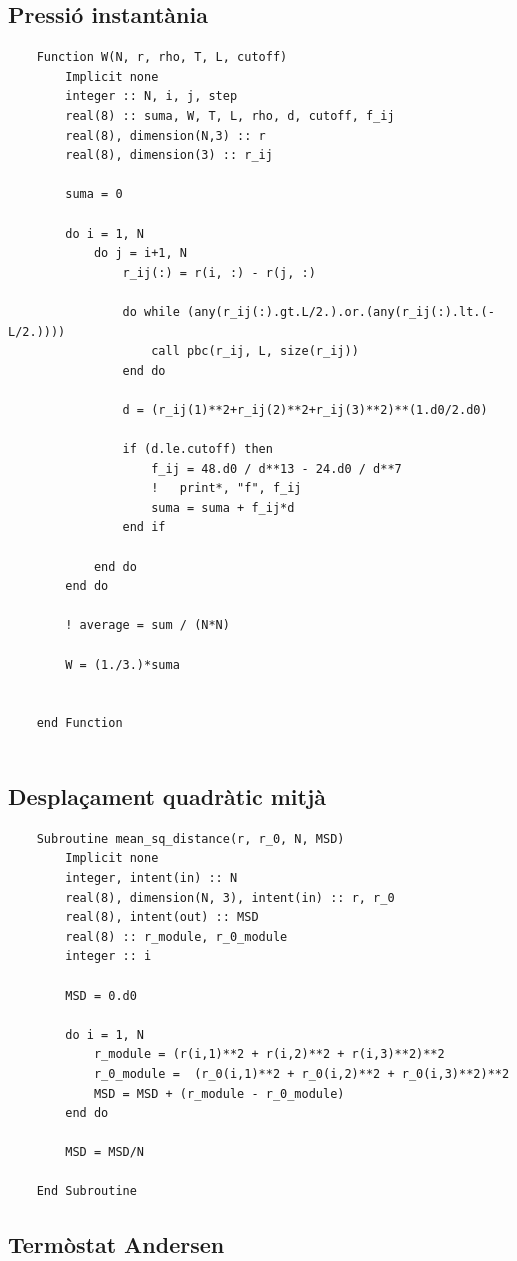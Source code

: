 \documentclass[a4paper,10pt]{article}
\begin{document}
\subsection{Pressió instantània}

\begin{lstlisting}
	Function W(N, r, rho, T, L, cutoff)
		Implicit none
		integer :: N, i, j, step
		real(8) :: suma, W, T, L, rho, d, cutoff, f_ij
		real(8), dimension(N,3) :: r
		real(8), dimension(3) :: r_ij
		
		suma = 0
		
		do i = 1, N
			do j = i+1, N
				r_ij(:) = r(i, :) - r(j, :)
				
				do while (any(r_ij(:).gt.L/2.).or.(any(r_ij(:).lt.(-L/2.))))
					call pbc(r_ij, L, size(r_ij))
				end do
				
				d = (r_ij(1)**2+r_ij(2)**2+r_ij(3)**2)**(1.d0/2.d0)
				
				if (d.le.cutoff) then
					f_ij = 48.d0 / d**13 - 24.d0 / d**7
					!	print*, "f", f_ij
					suma = suma + f_ij*d
				end if 
			
			end do
		end do
		
		! average = sum / (N*N)
		
		W = (1./3.)*suma
		
	
	end Function
	
\end{lstlisting}

\subsection{Desplaçament quadràtic mitjà}

\begin{lstlisting}
	Subroutine mean_sq_distance(r, r_0, N, MSD)
		Implicit none
		integer, intent(in) :: N
		real(8), dimension(N, 3), intent(in) :: r, r_0
		real(8), intent(out) :: MSD
		real(8) :: r_module, r_0_module
		integer :: i
		
		MSD = 0.d0
		
		do i = 1, N
			r_module = (r(i,1)**2 + r(i,2)**2 + r(i,3)**2)**2
			r_0_module =  (r_0(i,1)**2 + r_0(i,2)**2 + r_0(i,3)**2)**2
			MSD = MSD + (r_module - r_0_module)
		end do
		
		MSD = MSD/N
	
	End Subroutine
\end{lstlisting}



\subsection{Termòstat Andersen}
\end{document}
